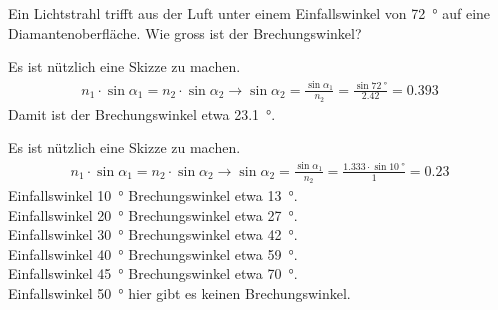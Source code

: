 \documentclass[paper=a4,twoside=true,,DIV13,BCOR1cm]{scrartcl}
\begin{document}
\begin{aufgabe}
	Ein Lichtstrahl trifft aus der Luft unter einem Einfallswinkel von \SI{72}{\degree} auf eine Diamantenoberfläche.
	Wie gross ist der Brechungswinkel?


	\begin{loesung}
		Es ist nützlich eine Skizze zu machen.
		\begin{eqnarray*}
			n_1\cdot\sin\alpha_1 = n_2\cdot\sin\alpha_2 \to \sin\alpha_2=\frac{\sin\alpha_1}{n_2}=\frac{\sin\SI{72}{\degree}}{\num{2.42}}=\num{0.393}
		\end{eqnarray*}
		Damit ist der Brechungswinkel etwa \SI{23.1}{\degree}.
	\end{loesung}
\end{aufgabe}


\begin{loesung}
		Es ist nützlich eine Skizze zu machen.
		\begin{eqnarray*}
			n_1\cdot\sin\alpha_1 = n_2\cdot\sin\alpha_2 \to \sin\alpha_2=\frac{\sin\alpha_1}{n_2}=\frac{\num{1.333}\cdot\sin\SI{10}{\degree}}{1}=\num{0.23}
		\end{eqnarray*}
		Einfallswinkel \SI{10}{\degree} Brechungswinkel etwa \SI{13}{\degree}.\\
		Einfallswinkel \SI{20}{\degree} Brechungswinkel etwa \SI{27}{\degree}.\\
		Einfallswinkel \SI{30}{\degree} Brechungswinkel etwa \SI{42}{\degree}.\\
		Einfallswinkel \SI{40}{\degree} Brechungswinkel etwa \SI{59}{\degree}.\\
		Einfallswinkel \SI{45}{\degree} Brechungswinkel etwa \SI{70}{\degree}.\\
		Einfallswinkel \SI{50}{\degree} hier gibt es keinen Brechungswinkel.
\end{loesung}
\end{document}
